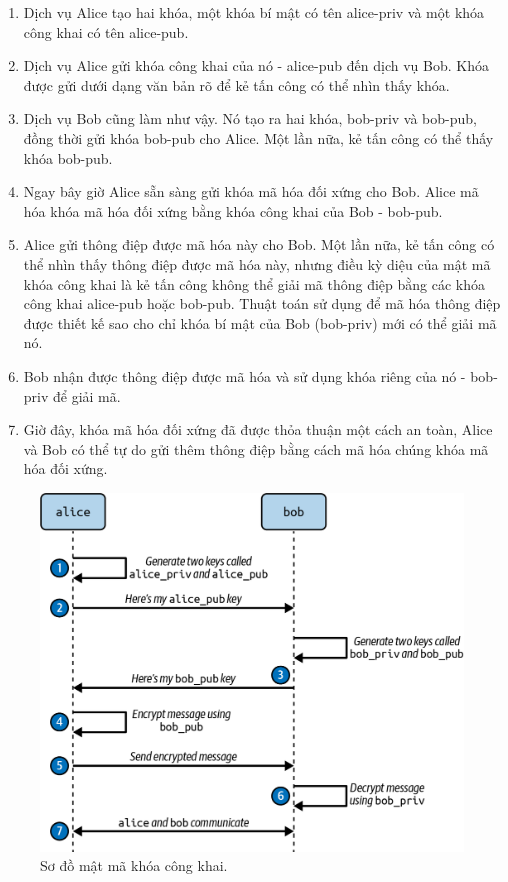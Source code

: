 \documentclass[12pt,a4paper]{report}
\begin{document}
	\hspace{0.3cm}{Hãy xem qua một ví dụ sử dụng hai dịch vụ tưởng tượng, Alice và Bob, muốn đồng ý về một khóa mã hóa đối xứng:}
	
	\begin{enumerate}
	\item Dịch vụ Alice tạo hai khóa, một khóa bí mật có tên alice-priv và một khóa công khai có tên alice-pub.
	\item Dịch vụ Alice gửi khóa công khai của nó - alice-pub đến dịch vụ Bob. Khóa được gửi dưới dạng văn bản rõ để kẻ tấn công có thể nhìn thấy khóa.
	\item Dịch vụ Bob cũng làm như vậy. Nó tạo ra hai khóa, bob-priv và bob-pub, đồng thời gửi khóa bob-pub cho Alice. Một lần nữa, kẻ tấn công có thể thấy khóa bob-pub.
	\item Ngay bây giờ Alice sẵn sàng gửi khóa mã hóa đối xứng cho Bob. Alice mã hóa khóa mã hóa đối xứng bằng khóa công khai của Bob - bob-pub.
	\item Alice gửi thông điệp được mã hóa này cho Bob. Một lần nữa, kẻ tấn công có thể nhìn thấy thông điệp được mã hóa này, nhưng điều kỳ diệu của mật mã khóa công khai là kẻ tấn công không thể giải mã thông điệp bằng các khóa công khai alice-pub hoặc bob-pub. Thuật toán sử dụng để mã hóa thông điệp được thiết kế sao cho chỉ khóa bí mật của Bob (bob-priv) mới có thể giải mã nó.
	\item Bob nhận được thông điệp được mã hóa và sử dụng khóa riêng của nó - bob-priv để giải mã.
	\item Giờ đây, khóa mã hóa đối xứng đã được thỏa thuận một cách an toàn, Alice và Bob có thể tự do gửi thêm thông điệp bằng cách mã hóa chúng khóa mã hóa đối xứng.
	\end{enumerate}

	\begin{figure}[h]
		\centering
		\includegraphics[width=0.7\linewidth]{Pics/public-key_cryptography}
		\caption{\label{fig:public-keycryptography} Sơ đồ mật mã khóa công khai.}
		\label{fig:public-keycryptography}
	\end{figure}
	
\end{document}
